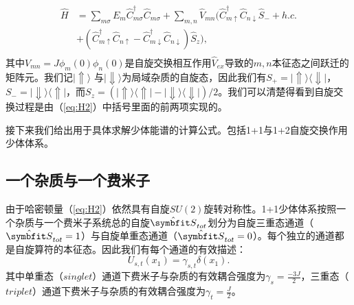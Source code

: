 \begin{equation}
	\begin{split}
		\hat{H} &= \sum_{m\sigma}E_m \hat{C}_{m\sigma}^\dagger \hat{C}_{m\sigma} + \sum_{m,n} \hat{V}_{mn} ( \hat{C}_{m\uparrow}^\dagger  \hat{C}_{n\downarrow} \hat{S}_- + h.c. \\
     	& +   (\hat{C}_{m\uparrow}^\dagger  \hat{C}_{n\uparrow}-\hat{C}_{m\downarrow}^\dagger  \hat{C}_{n\downarrow}) \hat{S}_{z} ), \label{eq:H2}\\
\end{split}
\end{equation}
其中$V_{mn} = J\phi_m(0)\phi_n(0)$是自旋交换相互作用$\hat{V}_{ex}$导致的$m,n$本征态之间跃迁的矩阵元。我们记$|\Uparrow\rangle$ 与$|\Downarrow\rangle$为局域杂质的自旋态，因此我们有$S_+=|\Uparrow\rangle\langle \Downarrow|$，$S_-=|\Downarrow\rangle\langle \Uparrow|$，而$S_z=(|\Uparrow\rangle\langle \Uparrow|-|\Downarrow\rangle\langle \Downarrow|)/2$。我们可以清楚得看到自旋交换过程是由（\ref{eq:H2}）中括号里面的前两项实现的。

接下来我们给出用于具体求解少体能谱的计算公式。包括1+1与1+2自旋交换作用少体体系。

\subsection{一个杂质与一个费米子}
由于哈密顿量（\ref{eq:H2}）依然具有自旋$SU(2)$旋转对称性。1+1少体体系按照一个杂质与一个费米子系统总的自旋$\hat{\Vector{S}}_{tot}$划分为自旋三重态通道（$\hat{\Vector{S}}_{tot}=1$）与自旋单重态通道（$\hat{\Vector{S}}_{tot}=0$）。每个独立的通道都是自旋算符的本征态。因此我们有每个通道的有效描述：
\begin{equation}
U_{s,t}(x_1)=\gamma_{s,t}\delta(x_1).
\end{equation}
其中单重态（$singlet$）通道下费米子与杂质的有效耦合强度为$\gamma_s = \frac{-3J}{2}$，三重态（$triplet$）通道下费米子与杂质的有效耦合强度为$\gamma_t = \frac{J}{2}$。

